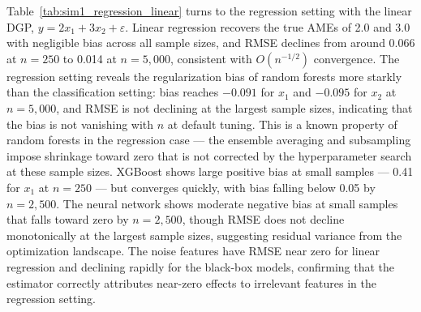 \documentclass[12pt]{article}
\begin{document}
	Table~\ref{tab:sim1_regression_linear} turns to the regression setting with the linear DGP, $y = 2x_1 + 3x_2 + \varepsilon$. Linear regression recovers the true AMEs of 2.0 and 3.0 with negligible bias across all sample sizes, and RMSE declines from around 0.066 at $n=250$ to 0.014 at $n=5{,}000$, consistent with $O(n^{-1/2})$ convergence. The regression setting reveals the regularization bias of random forests more starkly than the classification setting: bias reaches $-0.091$ for $x_1$ and $-0.095$ for $x_2$ at $n=5{,}000$, and RMSE is not declining at the largest sample sizes, indicating that the bias is not vanishing with $n$ at default tuning. This is a known property of random forests in the regression case --- the ensemble averaging and subsampling impose shrinkage toward zero that is not corrected by the hyperparameter search at these sample sizes. XGBoost shows large positive bias at small samples --- 0.41 for $x_1$ at $n=250$ --- but converges quickly, with bias falling below 0.05 by $n=2{,}500$. The neural network shows moderate negative bias at small samples that falls toward zero by $n=2{,}500$, though RMSE does not decline monotonically at the largest sample sizes, suggesting residual variance from the optimization landscape. The noise features have RMSE near zero for linear regression and declining rapidly for the black-box models, confirming that the estimator correctly attributes near-zero effects to irrelevant features in the regression setting.
	
\end{document}
